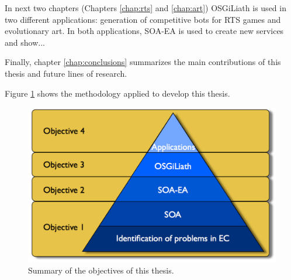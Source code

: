 In next two chapters (Chapters \ref{chap:rts} and \ref{chap:art}) OSGiLiath is used in two different applications: generation of competitive bots for RTS games and evolutionary art. In both applications, SOA-EA is used to create new services and show...

Finally, chapter \ref{chap:conclusions} summarizes the main contributions of this thesis and future lines of research.

Figure \ref{fig:intro:piramid} shows the methodology applied to develop this thesis.

\begin{figure}
\centering
 \includegraphics[scale =0.3] {gfx/intro/tesispiramide.pdf}
\caption{Summary of the objectives of this thesis.}
\label{fig:intro:piramid}
\end{figure}

